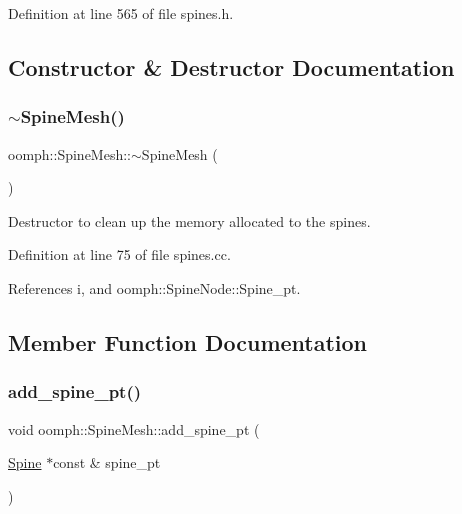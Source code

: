 Definition at line 565 of file spines.\+h.



\subsection{Constructor \& Destructor Documentation}
\mbox{\label{classoomph_1_1SpineMesh_ad60286797fb2e8fc4d72efd2719b5623}} 
\subsubsection{\texorpdfstring{$\sim$\+Spine\+Mesh()}{~SpineMesh()}}
{\footnotesize\ttfamily oomph\+::\+Spine\+Mesh\+::$\sim$\+Spine\+Mesh (\begin{DoxyParamCaption}{ }\end{DoxyParamCaption})\hspace{0.3cm}{\ttfamily [virtual]}}



Destructor to clean up the memory allocated to the spines. 



Definition at line 75 of file spines.\+cc.



References i, and oomph\+::\+Spine\+Node\+::\+Spine\+\_\+pt.



\subsection{Member Function Documentation}
\mbox{\label{classoomph_1_1SpineMesh_a4bd8248041f7ed8337d65ce763afa8ee}} 
\subsubsection{\texorpdfstring{add\+\_\+spine\+\_\+pt()}{add\_spine\_pt()}}
{\footnotesize\ttfamily void oomph\+::\+Spine\+Mesh\+::add\+\_\+spine\+\_\+pt (\begin{DoxyParamCaption}\item[{\hyperlink{classoomph_1_1Spine}{Spine} $\ast$const \&}]{spine\+\_\+pt }\end{DoxyParamCaption})\hspace{0.3cm}{\ttfamily [inline]}}



